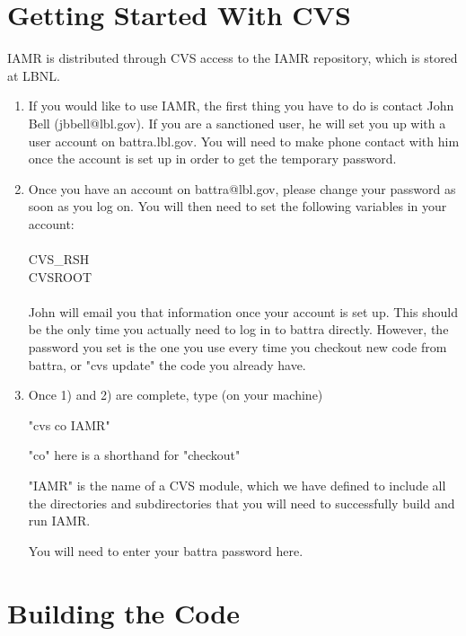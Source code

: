 
\section{Getting Started With CVS}

IAMR is distributed through CVS access to the IAMR repository, which is stored at LBNL.
\begin{enumerate}
\item If you would like to use IAMR, the first thing you have to do is contact John Bell (jbbell@lbl.gov). If you are a sanctioned user, he will set you up with a user account on battra.lbl.gov. You will need to make phone contact with him once the account is set up in order to get the temporary password.
\item Once you have an account on battra@lbl.gov, please change your password as soon as you log on. You will then need to set the following variables in your account:\\ \\
CVS\_RSH \\
CVSROOT \\ \\
John will email you that information once your account is set up. This should be the only time you actually need to log in to battra directly. However, the password you set is the one you use every time you checkout new code from battra, or "cvs update" the code you already have.
\item Once 1) and 2) are complete, type (on your machine)

"cvs co IAMR"

"co" here is a shorthand for "checkout"

"IAMR" is the name of a CVS module, which we have defined to 
include all the directories and subdirectories that you will need 
to successfully build and run IAMR.

You will need to enter your battra password here.

\end{enumerate}

\section{Building the Code}

